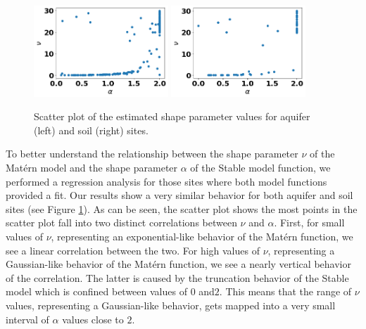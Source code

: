 \documentclass{article}
\begin{document}
\begin{figure}[ht]
    \includegraphics[width=0.45\textwidth]{fig/shape_parameter_aquifer_scatter.png}
    \includegraphics[width=0.45\textwidth]{fig/shape_parameter_soil_scatter.png}
    \caption{Scatter plot of the estimated shape parameter values for aquifer (left) and soil (right) sites.}
    \label{fig:shape_parameter}
\end{figure}

To better understand the relationship between the shape parameter $\nu$ of the Mat{\'e}rn model and the shape parameter $\alpha$ of the Stable model function, we performed a regression analysis for those sites where both model functions provided a fit. Our results show a very similar behavior for both aquifer and soil sites (see Figure \ref{fig:shape_parameter}). As can be seen, the scatter plot shows the most points in the scatter plot fall into two distinct correlations between $\nu$ and $\alpha$. First, for small values of $\nu$, representing an exponential-like behavior of the Mat{\'e}rn function, we see a linear correlation between the two. For high values of $\nu$, representing a Gaussian-like behavior of the  Mat{\'e}rn function, we see a nearly vertical behavior of the correlation. The latter is caused by the truncation behavior of the Stable model which is confined between values of $0$ and$2$. This means that the range of $\nu$ values, representing a Gaussian-like behavior, gets mapped into a very small interval of $\alpha$ values close to $2$.
\end{document}
